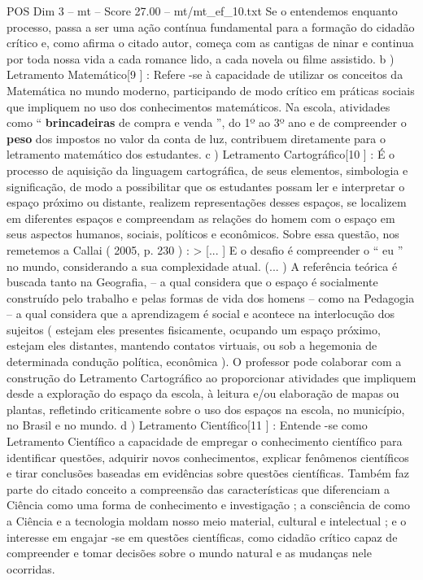 \begin{textsample}{POS Dim 3 – mt – Score 27.00 – mt/mt\_ef\_10.txt}
Se o entendemos enquanto processo, passa a ser uma ação contínua fundamental para a formação do cidadão crítico e, como afirma o citado autor, começa com as cantigas de ninar e continua por toda nossa vida a cada romance lido, a cada novela ou filme assistido. b ) Letramento Matemático[9 ] : Refere -se à capacidade de utilizar os conceitos da Matemática no mundo moderno, participando de modo crítico em práticas sociais que impliquem no uso dos conhecimentos matemáticos.
Na escola, atividades como “ \textbf{brincadeiras} de compra e venda ”, do 1º ao 3º ano e de compreender o \textbf{peso} dos impostos no valor da conta de luz, contribuem diretamente para o letramento matemático dos estudantes. c ) Letramento Cartográfico[10 ] : É o processo de aquisição da linguagem cartográfica, de seus elementos, simbologia e significação, de modo a possibilitar que os estudantes possam ler e interpretar o espaço próximo ou distante, realizem representações desses espaços, se localizem em diferentes espaços e compreendam as relações do homem com o espaço em seus aspectos humanos, sociais, políticos e econômicos.
Sobre essa questão, nos remetemos a Callai ( 2005, p. 230 ) : > [... ] E o desafio é compreender o “ eu ” no mundo, considerando a sua complexidade atual. (... ) A referência teórica é buscada tanto na Geografia, – a qual considera que o espaço é socialmente construído pelo trabalho e pelas formas de vida dos homens – como na Pedagogia – a qual considera que a aprendizagem é social e acontece na interlocução dos sujeitos ( estejam eles presentes fisicamente, ocupando um espaço próximo, estejam eles distantes, mantendo contatos virtuais, ou sob a hegemonia de determinada condução política, econômica ).
O professor pode colaborar com a construção do Letramento Cartográfico ao proporcionar atividades que impliquem desde a exploração do espaço da escola, à leitura e/ou elaboração de mapas ou plantas, refletindo criticamente sobre o uso dos espaços na escola, no município, no Brasil e no mundo. d ) Letramento Científico[11 ] : Entende -se como Letramento Científico a capacidade de empregar o conhecimento científico para identificar questões, adquirir novos conhecimentos, explicar fenômenos científicos e tirar conclusões baseadas em evidências sobre questões científicas.
Também faz parte do citado conceito a compreensão das características que diferenciam a Ciência como uma forma de conhecimento e investigação ; a consciência de como a Ciência e a tecnologia moldam nosso meio material, cultural e intelectual ; e o interesse em engajar -se em questões científicas, como cidadão crítico capaz de compreender e tomar decisões sobre o mundo natural e as mudanças nele ocorridas.

\end{textsample}
